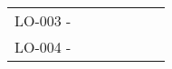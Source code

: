 \begin{landscape}
\begin{table}[]
{\begin{tabular}{lllllll}
LO-003 -                                                                    &                                                                                                                                                                                                                                                                &                                                                                                                                                                                                                                                                &                         &                                                                                                                                                                  &                                                                                                                                                 &                                                                                                                                        \\
LO-004 -                                                                    &                                                                                                                                                                                                                                                                &                                                                                                                                                                                                                                                                &                         &                                                                                                                                                                  &                                                                                                                                                 &                                                                                                                                        \\

\end{tabular}}
\end{table}
\end{landscape}
